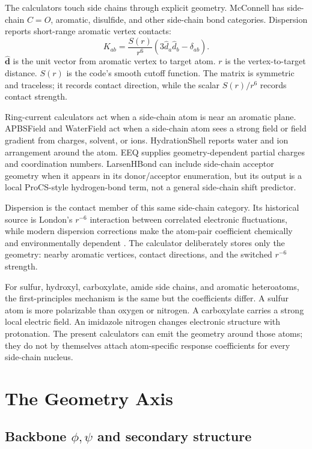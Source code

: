 \documentclass[11pt]{article}
\begin{document}
The calculators touch side chains through explicit geometry. McConnell has
side-chain \(C=O\), aromatic, disulfide, and other side-chain bond categories.
Dispersion reports short-range aromatic vertex contacts:
\[
  K_{ab}
  =
  \frac{S(r)}{r^6}\left(3\hat d_a\hat d_b-\delta_{ab}\right).
\]
\(\hat{\bm d}\) is the unit vector from aromatic vertex to target atom.
\(r\) is the vertex-to-target distance. \(S(r)\) is the code's smooth cutoff
function. The matrix is symmetric and traceless; it records contact direction,
while the scalar \(S(r)/r^6\) records contact strength.

Ring-current calculators act when a side-chain atom is near an aromatic plane.
APBSField and WaterField act when a side-chain atom sees a strong field or
field gradient from charges, solvent, or ions. HydrationShell reports water and
ion arrangement around the atom. EEQ supplies geometry-dependent partial
charges and coordination numbers. LarsenHBond can include side-chain acceptor
geometry when it appears in its donor/acceptor enumeration, but its output is a
local ProCS-style hydrogen-bond term, not a general side-chain shift predictor.

Dispersion is the contact member of this same side-chain category. Its
historical source is London's \(r^{-6}\) interaction between correlated
electronic fluctuations, while modern dispersion corrections make the
atom-pair coefficient chemically and environmentally dependent
\cite{london1937,grimme2010,wagner2015}. The calculator deliberately stores
only the geometry: nearby aromatic vertices, contact directions, and the
switched \(r^{-6}\) strength.

For sulfur, hydroxyl, carboxylate, amide side chains, and aromatic heteroatoms,
the first-principles mechanism is the same but the coefficients differ. A
sulfur atom is more polarizable than oxygen or nitrogen. A carboxylate carries
a strong local electric field. An imidazole nitrogen changes electronic
structure with protonation. The present calculators can emit the geometry
around those atoms; they do not by themselves attach atom-specific response
coefficients for every side-chain nucleus.

\section{The Geometry Axis}

\subsection{\texorpdfstring{Backbone \(\phi,\psi\) and secondary structure}
{Backbone phi/psi and secondary structure}}
\end{document}
